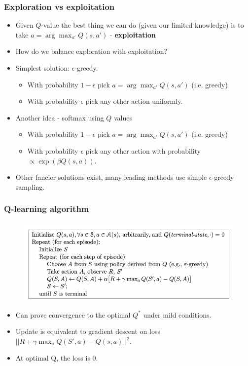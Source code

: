 \documentclass[handout]{beamer}
\renewcommand{\high}{\textbf}
\begin{document}
\begin{frame}\frametitle{Exploration vs exploitation}\small
\begin{itemize}
	\item Given $Q$-value the best thing we can do (given our limited knowledge) is to take $a=\arg\max_{a'}Q(s,a')$ - \high{exploitation}
	\onslide<2->\item How do we balance exploration with exploitation?
	\onslide<3->\item Simplest solution: $\epsilon$-greedy. 
	\begin{itemize}
		\item With probability $1-\epsilon$ pick $a=\arg\max_{a'}Q(s,a')$ (i.e. greedy)
		\item With probability $\epsilon$ pick any other action uniformly.
	\end{itemize} 
	\item Another idea - softmax using $Q$ values
	\begin{itemize}
		\item With probability $1-\epsilon$ pick $a=\arg\max_{a'}Q(s,a')$ (i.e. greedy)
		\item With probability $\epsilon$ pick any other action with probability $\propto\exp(\beta Q(s,a))$.
	\end{itemize} 
	\item Other fancier solutions exist, many leading methods use simple $\epsilon$-greedy sampling.
	
\end{itemize}
\end{frame}


\begin{frame}\frametitle{Q-learning algorithm}\small
\vspace{-0.5cm}
\begin{figure}
	 \includegraphics[width=0.9\linewidth]{Figures/Qalgo}
 \end{figure}
\vspace{-0.5cm}
\begin{itemize}
	\item Can prove convergence to the optimal $Q^*$ under mild conditions.
	\onslide<3->\item Update is equivalent to gradient descent on loss $||R+\gamma\max_a Q(S',a)-Q(s,a)||^2$.
	\item At optimal Q, the loss is 0.
	
\end{itemize}
\end{frame}
\end{document}
